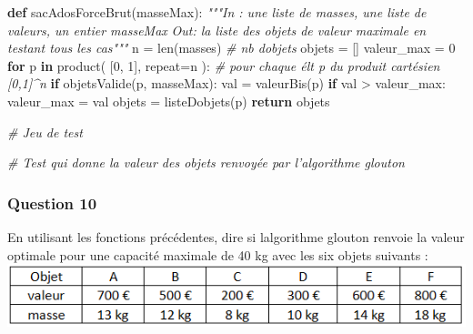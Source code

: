 \documentclass[
  paper=a4,
  ,captions=tableheading
]{scrartcl}
\newenvironment{Shaded}{}{}
\newcommand{\BuiltInTok}[1]{\textcolor[rgb]{0.00,0.50,0.00}{#1}}
\newcommand{\CommentTok}[1]{\textcolor[rgb]{0.38,0.63,0.69}{\textit{#1}}}
\newcommand{\ControlFlowTok}[1]{\textcolor[rgb]{0.00,0.44,0.13}{\textbf{#1}}}
\newcommand{\DecValTok}[1]{\textcolor[rgb]{0.25,0.63,0.44}{#1}}
\newcommand{\KeywordTok}[1]{\textcolor[rgb]{0.00,0.44,0.13}{\textbf{#1}}}
\newcommand{\NormalTok}[1]{#1}
\newcommand{\OperatorTok}[1]{\textcolor[rgb]{0.40,0.40,0.40}{#1}}
\begin{document}
\begin{Shaded}
\begin{Highlighting}[]
\KeywordTok{def}\NormalTok{ sacAdosForceBrut(masseMax):}
    \CommentTok{"""In : une liste de masses, une liste de valeurs, un entier masseMax}
\CommentTok{    Out: la liste des objets de valeur maximale en testant tous les cas"""}
\NormalTok{    n }\OperatorTok{=} \BuiltInTok{len}\NormalTok{(masses)  }\CommentTok{\# nb d\textquotesingle{}objets}
\NormalTok{    objets }\OperatorTok{=}\NormalTok{ []}
\NormalTok{    valeur\_max }\OperatorTok{=} \DecValTok{0}
    \ControlFlowTok{for}\NormalTok{ p }\KeywordTok{in}\NormalTok{ product(}
\NormalTok{        [}\DecValTok{0}\NormalTok{, }\DecValTok{1}\NormalTok{], repeat}\OperatorTok{=}\NormalTok{n}
\NormalTok{    ):  }\CommentTok{\# pour chaque élt p du produit cartésien [0,1]\^{}n}
        \ControlFlowTok{if}\NormalTok{ objetsValide(p, masseMax):}
\NormalTok{            val }\OperatorTok{=}\NormalTok{ valeurBis(p)}
            \ControlFlowTok{if}\NormalTok{ val }\OperatorTok{\textgreater{}}\NormalTok{ valeur\_max:}
\NormalTok{                valeur\_max }\OperatorTok{=}\NormalTok{ val}
\NormalTok{                objets }\OperatorTok{=}\NormalTok{ listeDobjets(p)}
    \ControlFlowTok{return}\NormalTok{ objets}
\end{Highlighting}
\end{Shaded}

\begin{Shaded}
\begin{Highlighting}[]
\CommentTok{\# Jeu de test}
\end{Highlighting}
\end{Shaded}

\begin{Shaded}
\begin{Highlighting}[]
\CommentTok{\# Test qui donne la valeur des objets renvoyée par l’algorithme glouton}
\end{Highlighting}
\end{Shaded}

\hypertarget{question-10}{%
\subsubsection{Question 10}\label{question-10}}

En utilisant les fonctions précédentes, dire si
l\textquotesingle algorithme glouton renvoie la valeur optimale pour une
capacité maximale de 40 kg avec les six objets suivants :
\includegraphics{images/4-image.png}
\end{document}
